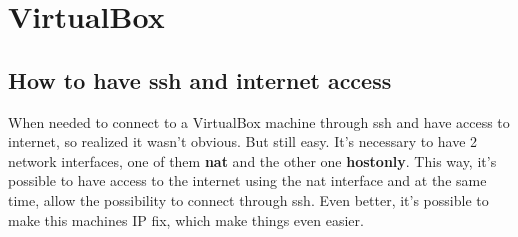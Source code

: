 \section{VirtualBox}
\subsection{How to have ssh and internet access}
When needed to connect to a VirtualBox machine through ssh and have access to internet, so realized it wasn't obvious. But still easy.
It's necessary to have 2 network interfaces, one of them \textbf{nat} and the other one \textbf{hostonly}.\newline
This way, it's possible to have access to the internet using the nat interface and at the same time, allow the possibility to connect through ssh. Even better, it's possible to make this machines IP fix, which make things even easier.
